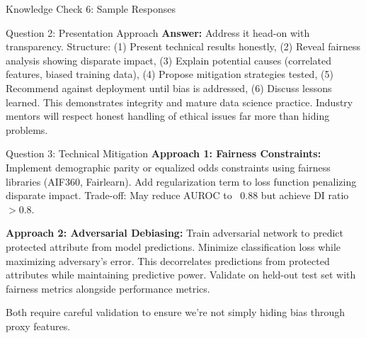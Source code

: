 \begin{frame}{Knowledge Check 6: Sample Responses}

\begin{block}{Question 2: Presentation Approach}
\small
\textbf{Answer:} Address it head-on with transparency. Structure: (1) Present technical results honestly, (2) Reveal fairness analysis showing disparate impact, (3) Explain potential causes (correlated features, biased training data), (4) Propose mitigation strategies tested, (5) Recommend against deployment until bias is addressed, (6) Discuss lessons learned. This demonstrates integrity and mature data science practice. Industry mentors will respect honest handling of ethical issues far more than hiding problems.
\end{block}

\vspace{0.2cm}

\begin{block}{Question 3: Technical Mitigation}
\small
\textbf{Approach 1: Fairness Constraints:} Implement demographic parity or equalized odds constraints using fairness libraries (AIF360, Fairlearn). Add regularization term to loss function penalizing disparate impact. Trade-off: May reduce AUROC to ~0.88 but achieve DI ratio $> 0.8$.

\textbf{Approach 2: Adversarial Debiasing:} Train adversarial network to predict protected attribute from model predictions. Minimize classification loss while maximizing adversary's error. This decorrelates predictions from protected attributes while maintaining predictive power. Validate on held-out test set with fairness metrics alongside performance metrics.

Both require careful validation to ensure we're not simply hiding bias through proxy features.
\end{block}
\end{frame}

